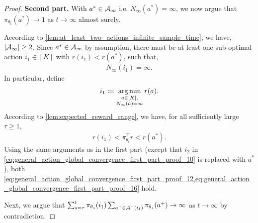 \begin{proof}
\clearpage
\textbf{Second part.} With $a^* \in {\mathcal{A}}_\infty$ i.e. $N_\infty(a^*) =  \infty$, we now argue that $\pi_{\theta_t}(a^*) \to 1$ as $t \to \infty$ almost surely.

According to \cref{lem:at_least_two_actions_infinite_sample_time}, we have, $| {\mathcal{A}}_\infty | \ge 2$. Since $a^* \in {\mathcal{A}}_\infty$ by assumption, there must be at least one sub-optimal action $i_1\in[K]$ with $r(i_1) < r(a^*)$, such that,
\begin{align}
\label{eq:general_action_global_convergence_second_part_proof_1}
    N_\infty(i_1) = \infty.
\end{align}
In particular, define
\begin{align}
\label{eq:general_action_global_convergence_second_part_proof_2}
    i_1 \coloneqq \operatorname*{arg\,min}_{\substack{a \in [K], \\ N_\infty(a) = \infty}} r(a).
\end{align}
According to \cref{lem:expected_reward_range},  we have, for all sufficiently large $\tau \ge 1$,
\begin{align}
\label{eq:general_action_global_convergence_second_part_proof_3}
    r(i_1) < \pi_{\theta_t}^\top r < r(a^*).
\end{align}
Using the same arguments as in the first part (except that $i_2$ in \cref{eq:general_action_global_convergence_first_part_proof_10} is replaced with $a^*$), both
\cref{eq:general_action_global_convergence_first_part_proof_12,eq:general_action_global_convergence_first_part_proof_16} hold. 

Next, we argue that $\sum_{s=\tau}^t \pi_{\theta_s}(i_1) \sum_{a^+ \in {\mathcal{A}}^+(i_1)}{ \pi_{\theta_s}(a^+) } \to \infty$ as $t \to \infty$ by contradiction. 


\end{proof}
